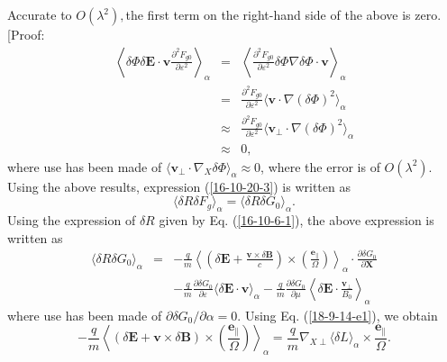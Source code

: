 \documentclass{article}
\newcommand{\tmmathbf}[1]{\ensuremath{\boldsymbol{#1}}}
\begin{document}
Accurate to $O (\lambda^2),$the first term on the right-hand side of the above
is zero. [Proof:
\begin{eqnarray}
  \left\langle \delta \Phi \delta \mathbf{E} \cdot \mathbf{v} \frac{\partial^2
  F_{g 0}}{\partial \varepsilon^2} \right\rangle_{\alpha} & = & \left\langle
  \frac{\partial^2 F_{g 0}}{\partial \varepsilon^2} \delta \Phi \nabla \delta
  \Phi \cdot \mathbf{v} \right\rangle_{\alpha} \nonumber\\
  & = & \frac{\partial^2 F_{g 0}}{\partial \varepsilon^2} \langle \mathbf{v}
  \cdot \nabla (\delta \Phi)^2 \rangle_{\alpha} \nonumber\\
  & \approx & \frac{\partial^2 F_{g 0}}{\partial \varepsilon^2} \langle
  \mathbf{v}_{\perp} \cdot \nabla (\delta \Phi)^2 \rangle_{\alpha} \nonumber\\
  & \approx & 0, 
\end{eqnarray}
where use has been made of $\langle \mathbf{v}_{\perp} \cdot \nabla_X \delta
\Phi \rangle_{\alpha} \approx 0$, where the error is of $O (\lambda^2)$. Using
the above results, expression (\ref{16-10-20-3}) is written as
\begin{equation}
  \label{16-10-20-7} \langle \delta R \delta F_g \rangle_{\alpha} = \langle
  \delta R \delta G_0 \rangle_{\alpha} .
\end{equation}
Using the expression of $\delta R$ given by Eq. (\ref{16-10-6-1}), the above
expression is written as
\begin{eqnarray}
  \langle \delta R \delta G_0 \rangle_{\alpha} & = & - \frac{q}{m}
  \left\langle \left( \delta \mathbf{E}+ \frac{\mathbf{v} \times \delta
  \mathbf{B}}{c} \right) \times \left( \frac{\tmmathbf{e}_{\parallel}}{\Omega}
  \right) \right\rangle_{\alpha} \cdot \frac{\partial \delta G_0}{\partial
  \mathbf{X}} \nonumber\\
  &  & - \frac{q}{m}  \frac{\partial \delta G_0}{\partial \varepsilon}
  \langle \delta \mathbf{E} \cdot \mathbf{v} \rangle_{\alpha} - \frac{q}{m} 
  \frac{\partial \delta G_0}{\partial \mu} \left\langle \delta \mathbf{E}
  \cdot \frac{\mathbf{v}_{\perp}}{B_0} \right\rangle_{\alpha} 
  \label{16-10-20-5}
\end{eqnarray}
where use has been made of $\partial \delta G_0 / \partial \alpha = 0$. Using
Eq. (\ref{18-9-14-e1}), we obtain
\begin{equation}
  - \frac{q}{m} \left\langle (\delta \mathbf{E}+\mathbf{v} \times \delta
  \mathbf{B}) \times \left( \frac{\tmmathbf{e}_{\parallel}}{\Omega}  \right)
  \right\rangle_{\alpha} = \frac{q}{m} \nabla_{X \perp} \langle \delta L
  \rangle_{\alpha} \times \frac{\tmmathbf{e}_{\parallel}}{\Omega} .
\end{equation}
\end{document}
